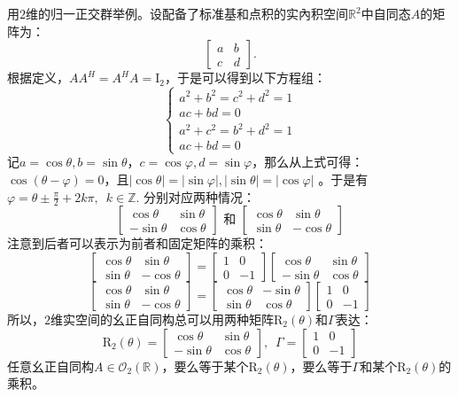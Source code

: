 \documentclass[12pt,UTF8,fontset=none]{ctexbook}
\begin{document}
用$2$维的归一正交群举例。设配备了标准基和点积的实內积空间$\mathbb{R}^2$中自同态$A$的矩阵为：
$$ \begin{bmatrix} a & b \\ c & d \end{bmatrix}. $$
根据定义，$A A^H = A^H A = \mathrm{I}_2$，于是可以得到以下方程组：
$$ \left\{
\begin{array}{l}
    a^2 + b^2 = c^2 + d^2 = 1 \\
    ac + bd = 0 \\
    a^2 + c^2 = b^2 + d^2 = 1 \\
    ac + bd = 0
\end{array} 
\right.
$$
记$a=\cos{\theta}, b = \sin{\theta}$，$c = \cos{\varphi}, d = \sin{\varphi}$，那么从上式可得：$\cos{(\theta - \varphi)} = 0$，且$|\cos{\theta}| = |\sin{\varphi}|, |\sin{\theta}| = |\cos{\varphi}|$ 。于是有$\varphi = \theta \pm \frac{\pi}{2} + 2k\pi, \,\,\, k\in\mathbb{Z}.$ 分别对应两种情况：
$$\begin{bmatrix}\cos{\theta} & \sin{\theta} \\ -\sin{\theta} & \cos{\theta}\end{bmatrix} \mbox{ 和 } \begin{bmatrix}\cos{\theta} & \sin{\theta} \\ \sin{\theta} & -\cos{\theta}\end{bmatrix}$$
注意到后者可以表示为前者和固定矩阵的乘积：
$$\begin{bmatrix}\cos{\theta} & \sin{\theta} \\ \sin{\theta} & -\cos{\theta}\end{bmatrix} =  \begin{bmatrix} 1 &0 \\ 0 & -1\end{bmatrix} \begin{bmatrix}\cos{\theta} & \sin{\theta} \\ -\sin{\theta} & \cos{\theta}\end{bmatrix}$$
$$\begin{bmatrix}\cos{\theta} & \sin{\theta} \\ \sin{\theta} & -\cos{\theta}\end{bmatrix} = \begin{bmatrix}\cos{\theta} & -\sin{\theta} \\ \sin{\theta} & \cos{\theta}\end{bmatrix}\begin{bmatrix} 1 &0 \\ 0 & -1\end{bmatrix}
$$
所以，$2$维实空间的幺正自同构总可以用两种矩阵$\mathrm{R}_2(\theta)$和$\Gamma$表达：
$$\mathrm{R}_2(\theta) = \begin{bmatrix}\cos{\theta} & \sin{\theta} \\ -\sin{\theta} & \cos{\theta}\end{bmatrix}, \,\,\, \Gamma = \begin{bmatrix} 1 &0 \\ 0 & -1\end{bmatrix}$$
任意幺正自同构$A\in\mathcal{O}_2(\mathbb{R})$，要么等于某个$\mathrm{R}_2(\theta)$，要么等于$\Gamma$和某个$\mathrm{R}_2(\theta)$的乘积。
\end{document}
